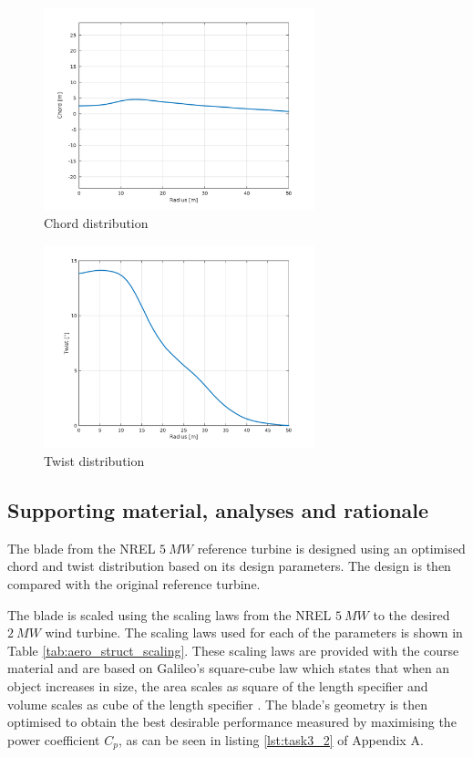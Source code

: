 \begin{figure}[H]
\centering
\includegraphics[width=0.7\textwidth]{Images/chord.png} 
\caption{Chord distribution}\label{fig:chord}
\end{figure}

\begin{figure}[H]
\centering
\includegraphics[width=0.7\textwidth]{Images/twist.png} 
\caption{Twist distribution}\label{fig:twist}
\end{figure}


\subsection{Supporting material, analyses and rationale}
The blade from the NREL $5\ MW$ reference turbine \cite{5MW} is designed using an optimised chord and twist distribution based on its design parameters. The design is then compared with the original reference turbine.

The blade is scaled using the scaling laws from the NREL $5\ MW$ to the desired $2\ MW$ wind turbine. The scaling laws used for each of the parameters is shown in Table \ref{tab:aero_struct_scaling}. These scaling laws are provided with the course material \cite{scaling_laws} and are based on Galileo's square-cube law which states that when an object increases in size, the area scales as square of the length specifier and volume scales as cube of the length specifier \cite{galileo}. The blade's geometry is then optimised to obtain the best desirable performance measured by maximising the power coefficient $C_p$, as can be seen in listing \ref{lst:task3_2} of Appendix A.

